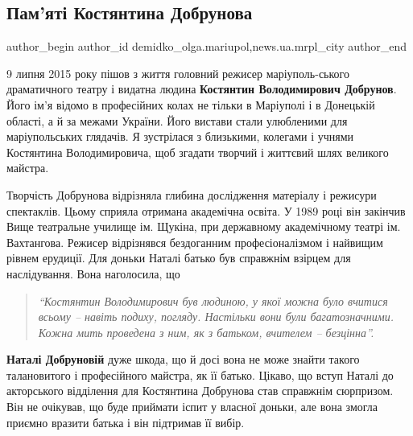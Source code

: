  
 
 
 
 
 
\subsection{Пам'яті Костянтина Добрунова}
\label{sec:08_07_2021.stz.news.ua.mrpl_city.1.kostyantyn_dobrunov}
 
\ifcmt
 author_begin
   author_id demidko_olga.mariupol,news.ua.mrpl_city
 author_end
\fi


9 липня 2015 року пішов з життя головний режисер маріуполь\hyp{}ського драматичного
театру і видатна людина \textbf{Костянтин Володимирович Добрунов}. Його ім'я відомо в
професійних колах не тільки в Маріуполі і в Донецькій області, а й за межами
України. Його вистави стали улюбленими для маріупольських глядачів. Я
зустрілася з близькими, колегами і учнями Костянтина Володимировича, щоб
згадати творчий і життєвий шлях великого майстра.

Творчість Добрунова відрізняла глибина дослідження матеріалу і режисури
спектаклів. Цьому сприяла отримана академічна освіта. У 1989 році він закінчив
Вище театральне училище ім. Щукіна, при державному академічному театрі
ім. Вахтангова. Режисер відрізнявся бездоганним професіоналізмом і найвищим
рівнем ерудиції. Для доньки Наталі батько був справжнім взірцем для
наслідування. Вона наголосила, що
\begin{quote}
\em\enquote{Костянтин Володимирович був людиною, у якої
можна було вчитися всьому – навіть подиху, погляду. Настільки вони були
багатозначними. Кожна мить проведена з ним, як з батьком, вчителем – безцінна}.
\end{quote}
\textbf{Наталі Добруновій} дуже шкода, що й досі вона не може знайти такого талановитого
і професійного майстра, як її батько. Цікаво, що вступ Наталі до акторського
відділення для Костянтина Добрунова став справжнім сюрпризом. Він не очікував,
що буде приймати іспит у власної доньки, але вона змогла приємно вразити батька
і він підтримав її вибір.

